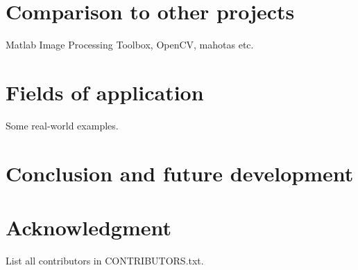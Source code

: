 \section{Comparison to other projects}

Matlab Image Processing Toolbox, OpenCV, mahotas etc.

\section{Fields of application}

Some real-world examples.

\section{Conclusion and future development}

\section{Acknowledgment}

List all contributors in CONTRIBUTORS.txt.


\nocite{*}


